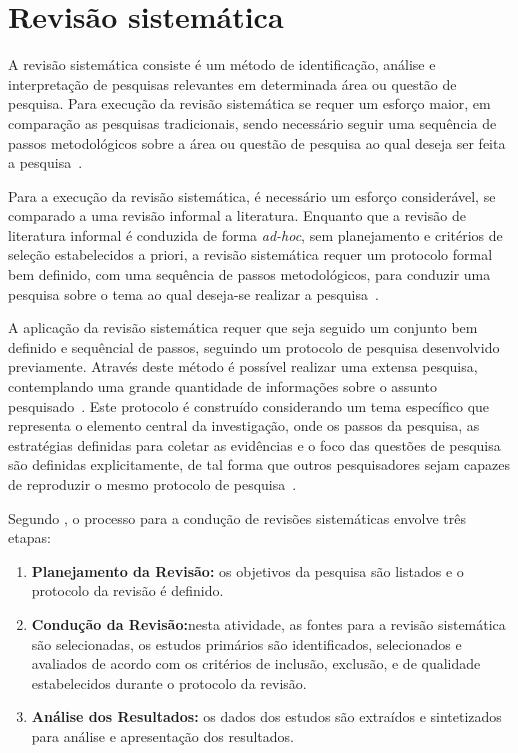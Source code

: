 \section{\label{sec:ApendiceA}Revisão sistemática}

A revisão sistemática consiste é um método de identificação, análise e interpretação de pesquisas relevantes em determinada área ou questão de pesquisa. Para execução da revisão sistemática se requer um esforço maior, em comparação as pesquisas tradicionais, sendo necessário seguir uma sequência de passos metodológicos sobre a área ou questão de pesquisa ao qual deseja ser feita a pesquisa~\cite{kitchenham2004procedures}.

Para a execução da revisão sistemática, é necessário um esforço considerável, se comparado a uma revisão informal a literatura. Enquanto que a revisão de literatura informal é conduzida de forma \textit{ad-hoc}, sem planejamento e critérios de seleção estabelecidos a priori, a revisão sistemática requer um protocolo formal bem definido, com uma sequência de passos metodológicos, para conduzir uma pesquisa sobre o tema ao qual deseja-se realizar a pesquisa~\cite{MafraTravassos}.

A aplicação da revisão sistemática requer que seja seguido um conjunto bem definido e sequêncial de passos, seguindo um protocolo de pesquisa desenvolvido previamente. Através deste método é possível realizar uma extensa pesquisa, contemplando uma grande quantidade de informações sobre o assunto pesquisado~\cite{MafraTravassos}. Este protocolo é construído considerando um tema específico que representa o elemento central da investigação, onde os passos da pesquisa, as estratégias definidas para coletar as evidências e o foco das questões de pesquisa são definidas explicitamente, de tal forma que outros pesquisadores sejam capazes de reproduzir o mesmo protocolo de pesquisa~\cite{biolchini2005systematic}.

Segundo \citeauthor{MafraTravassos}, o processo para a condução de revisões sistemáticas envolve três etapas:
\begin{enumerate}
  \item \textbf{Planejamento da Revisão:} os objetivos da pesquisa são listados e o protocolo da revisão é definido.
  \item \textbf{Condução da Revisão:}nesta atividade, as fontes para a revisão sistemática são selecionadas, os estudos primários são identificados, selecionados e avaliados de acordo com os critérios de inclusão, exclusão, e de qualidade estabelecidos durante o protocolo da revisão.
  \item \textbf{Análise dos Resultados:} os dados dos estudos são extraídos e sintetizados para análise e apresentação dos resultados.
\end{enumerate}

